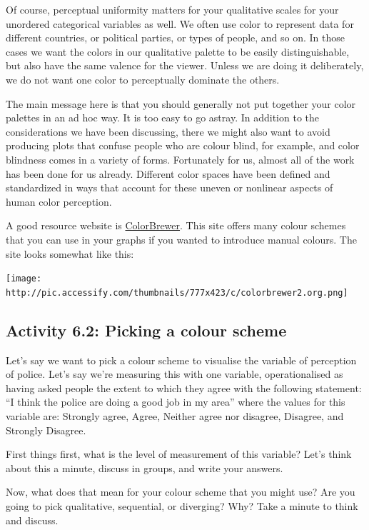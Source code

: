 \documentclass[
]{book}
\begin{document}
Of course, perceptual uniformity matters for your qualitative scales for your unordered categorical variables as well. We often use color to represent data for different countries, or political parties, or types of people, and so on. In those cases we want the colors in our qualitative palette to be easily distinguishable, but also have the same valence for the viewer. Unless we are doing it deliberately, we do not want one color to perceptually dominate the others.

The main message here is that you should generally not put together your color palettes in an ad hoc way. It is too easy to go astray. In addition to the considerations we have been discussing, there we might also want to avoid producing plots that confuse people who are colour blind, for example, and color blindness comes in a variety of forms. Fortunately for us, almost all of the work has been done for us already. Different color spaces have been defined and standardized in ways that account for these uneven or nonlinear aspects of human color perception.

A good resource website is \href{http://colorbrewer2.org/}{ColorBrewer}. This site offers many colour schemes that you can use in your graphs if you wanted to introduce manual colours. The site looks somewhat like this:

\texttt{[image: http://pic.accessify.com/thumbnails/777x423/c/colorbrewer2.org.png]}

\hypertarget{activity-6.2-picking-a-colour-scheme}{%
\subsection{Activity 6.2: Picking a colour scheme}\label{activity-6.2-picking-a-colour-scheme}}

Let's say we want to pick a colour scheme to visualise the variable of perception of police. Let's say we're measuring this with one variable, operationalised as having asked people the extent to which they agree with the following statement: ``I think the police are doing a good job in my area'' where the values for this variable are: Strongly agree, Agree, Neither agree nor disagree, Disagree, and Strongly Disagree.

First things first, what is the level of measurement of this variable? Let's think about this a minute, discuss in groups, and write your answers.

Now, what does that mean for your colour scheme that you might use? Are you going to pick qualitative, sequential, or diverging? Why? Take a minute to think and discuss.
\end{document}
